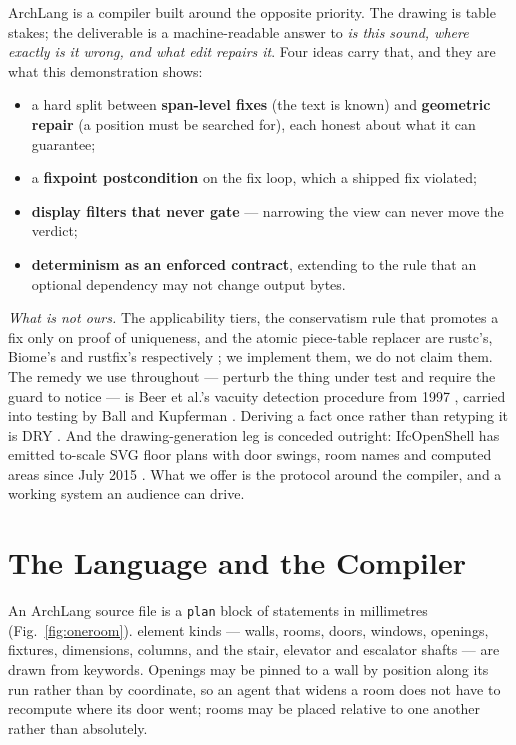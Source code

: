 \documentclass[10pt,conference]{IEEEtran}
\begin{document}
ArchLang is a compiler built around the opposite priority. The drawing is table
stakes; the deliverable is a machine-readable answer to \emph{is this sound, where
exactly is it wrong, and what edit repairs it}. Four ideas carry that, and they are
what this demonstration shows:

\begin{itemize}
\item a hard split between \textbf{span-level fixes} (the text is known) and
      \textbf{geometric repair} (a position must be searched for), each honest about
      what it can guarantee;
\item a \textbf{fixpoint postcondition} on the fix loop, which a shipped fix violated;
\item \textbf{display filters that never gate} --- narrowing the view can never move
      the verdict;
\item \textbf{determinism as an enforced contract}, extending to the rule that an
      optional dependency may not change output bytes.
\end{itemize}

\emph{What is not ours.} The applicability tiers, the conservatism rule that promotes
a fix only on proof of uniqueness, and the atomic piece-table replacer are rustc's,
Biome's and rustfix's respectively \cite{rustc_applicability,biome_linter,rustfix}; we
implement them, we do not claim them. The remedy we use throughout --- perturb the
thing under test and require the guard to notice --- is Beer et al.'s vacuity
detection procedure from 1997 \cite{beer1997vacuity}, carried into testing by Ball and
Kupferman \cite{ball2008vacuitytesting}. Deriving a fact once rather than retyping it
is DRY \cite{hunt1999pragmatic}. And the drawing-generation leg is conceded outright:
IfcOpenShell has emitted to-scale SVG floor plans with door swings, room names and
computed areas since July 2015 \cite{ifcopenshell}. What we offer is the protocol
around the compiler, and a working system an audience can drive.

\section{The Language and the Compiler}

An ArchLang source file is a \texttt{plan} block of statements in millimetres
(Fig.~\ref{fig:oneroom}). \factKeywordsElement{} element kinds --- walls, rooms,
doors, windows, openings, fixtures, dimensions, columns, and the stair, elevator and
escalator shafts --- are drawn from \factKeywordsTotal{} keywords. Openings may be pinned to a wall by
position along its run rather than by coordinate, so an agent that widens a room does
not have to recompute where its door went; rooms may be placed relative to one another
rather than absolutely.
\end{document}
